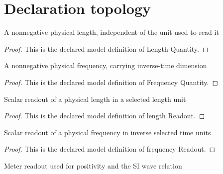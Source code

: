 \section{Declaration topology}
\begin{definition}
  \label{def:physics:phyx-mini-0123:phyxminiproblems-problemphyxmini0123-lengthquantity}
  A nonnegative physical length, independent of the unit used to read it
\end{definition}
\begin{proof}
  This is the declared model definition of Length Quantity.
\end{proof}
\begin{definition}
  \label{def:physics:phyx-mini-0123:phyxminiproblems-problemphyxmini0123-frequencyquantity}
  A nonnegative physical frequency, carrying inverse-time dimension
\end{definition}
\begin{proof}
  This is the declared model definition of Frequency Quantity.
\end{proof}
\begin{definition}
  \label{def:physics:phyx-mini-0123:phyxminiproblems-problemphyxmini0123-lengthreadout}
  Scalar readout of a physical length in a selected length unit
\end{definition}
\begin{proof}
  This is the declared model definition of length Readout.
\end{proof}
\begin{definition}
  \label{def:physics:phyx-mini-0123:phyxminiproblems-problemphyxmini0123-frequencyreadout}
  Scalar readout of a physical frequency in inverse selected time units
\end{definition}
\begin{proof}
  This is the declared model definition of frequency Readout.
\end{proof}
\begin{definition}
  \label{def:physics:phyx-mini-0123:phyxminiproblems-problemphyxmini0123-lengthinmeters}
  Meter readout used for positivity and the SI wave relation
\end{definition}
